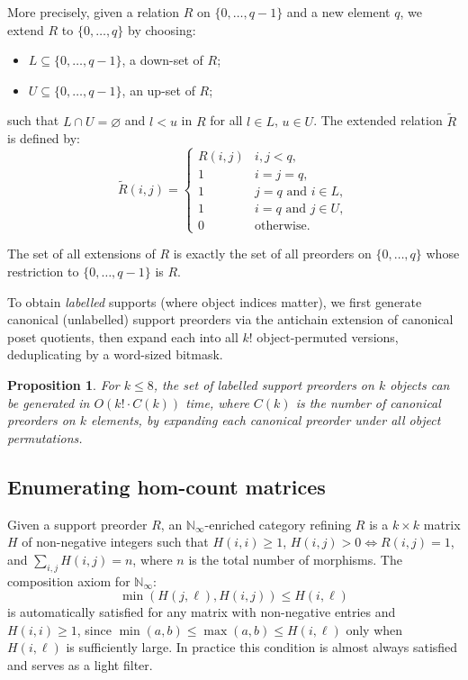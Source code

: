 \documentclass[12pt,a4paper]{amsart}
\newtheorem{proposition}[theorem]{Proposition}
\theoremstyle{definition}
\theoremstyle{remark}
\begin{document}
More precisely, given a relation $R$ on $\{0,\dots,q-1\}$ and a new element
$q$, we extend $R$ to $\{0,\dots,q\}$ by choosing:
\begin{itemize}
  \item $L \subseteq \{0,\dots,q-1\}$, a down-set of $R$;
  \item $U \subseteq \{0,\dots,q-1\}$, an up-set of $R$;
\end{itemize}
such that $L \cap U = \varnothing$ and $l < u$ in $R$ for all $l \in L$,
$u \in U$.  The extended relation $\tilde{R}$ is defined by:
\[
\tilde{R}(i,j) =
\begin{cases}
R(i,j) & i,j < q, \\
1 & i = j = q, \\
1 & j = q \text{ and } i \in L, \\
1 & i = q \text{ and } j \in U, \\
0 & \text{otherwise}.
\end{cases}
\]

The set of all extensions of $R$ is exactly the set of all preorders on
$\{0,\dots,q\}$ whose restriction to $\{0,\dots,q-1\}$ is $R$.

To obtain \emph{labelled} supports (where object indices matter), we first
generate canonical (unlabelled) support preorders via the antichain
extension of canonical poset quotients, then expand each into all $k!$
object-permuted versions, deduplicating by a word-sized bitmask.

\begin{proposition}
  \label{prop:canonical-supports}
  For $k \leq 8$, the set of labelled support preorders on $k$ objects
  can be generated in $O(k! \cdot C(k))$ time, where $C(k)$ is the number
  of canonical preorders on $k$ elements, by expanding each canonical
  preorder under all object permutations.
\end{proposition}

\subsection{Enumerating hom-count matrices}

Given a support preorder $R$, an $\mathbb{N}_\infty$-enriched category
refining $R$ is a $k \times k$ matrix $H$ of non-negative integers such
that $H(i,i) \geq 1$, $H(i,j) > 0 \iff R(i,j) = 1$, and
$\sum_{i,j} H(i,j) = n$, where $n$ is the total number of morphisms.
The composition axiom for $\mathbb{N}_\infty$:
\[
\min(H(j,\ell), H(i,j)) \leq H(i,\ell)
\]
is automatically satisfied for any matrix with non-negative entries and
$H(i,i) \geq 1$, since $\min(a,b) \leq \max(a,b) \leq H(i,\ell)$ only when
$H(i,\ell)$ is sufficiently large.  In practice this condition is almost
always satisfied and serves as a light filter.
\end{document}
